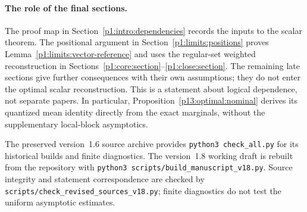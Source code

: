 \paragraph{The role of the final sections.}
The proof map in Section~\ref{p1:intro:dependencies} records
the inputs to the scalar theorem.
The positional argument in Section~\ref{p1:limits:positions}
proves Lemma~\ref{p1:limits:vector-reference} and uses the
regular-set weighted reconstruction in Sections~\ref{p1:core:section}--\ref{p1:close:section}.
The remaining late sections give further consequences with their own
assumptions; they do not enter the optimal scalar reconstruction.
This is a statement about logical dependence, not separate papers.
In particular, Proposition~\ref{p13:optimal:nominal} derives its
quantized mean identity directly from the exact marginals,
without the supplementary local-block asymptotics.

The preserved version~1.6 source archive provides
\texttt{python3 check\_all.py} for its historical builds and finite
diagnostics. The version~1.8 working draft is rebuilt from the repository with
\texttt{python3 scripts/build\_manuscript\_v18.py}.
Source integrity and statement correspondence are checked by
\texttt{scripts/check\_revised\_sources\_v18.py}; finite diagnostics
do not test the uniform asymptotic estimates.
